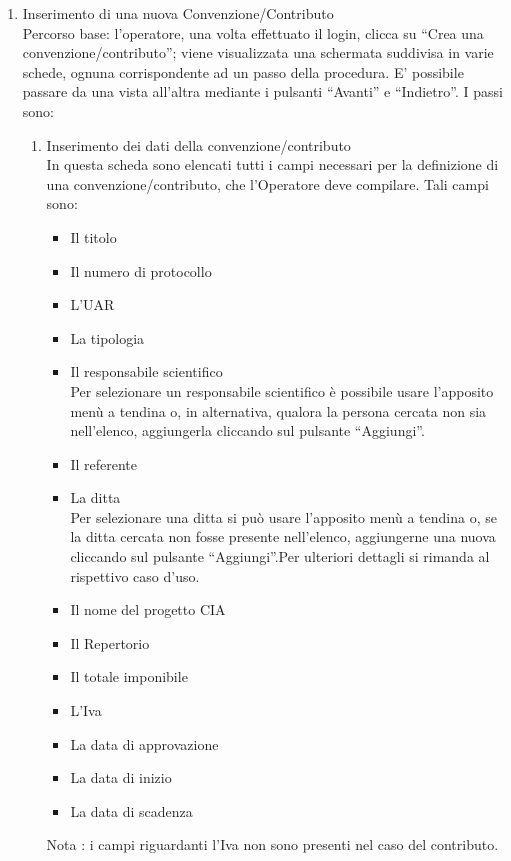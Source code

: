 \begin{enumerate}
  \item Inserimento di una nuova Convenzione/Contributo\\
  
  Percorso base:
  l'operatore, una volta effettuato il login, clicca su ``Crea una convenzione/contributo''; viene visualizzata una schermata suddivisa in varie schede,
  ognuna corrispondente ad un passo della procedura. E' possibile passare da una vista all'altra mediante i pulsanti ``Avanti'' e ``Indietro''. I passi sono:
  \begin{enumerate}
    \item Inserimento dei dati della convenzione/contributo\\
      
      In questa scheda sono elencati tutti i campi necessari per la definizione di una convenzione/contributo, 
      che l'Operatore deve compilare. Tali campi sono:
      \begin{itemize}
	\item Il titolo
	\item Il numero di protocollo
	\item L'UAR
	\item La tipologia
	\item Il responsabile scientifico\\
	  Per selezionare un responsabile scientifico è possibile usare l'apposito menù a tendina o, in alternativa, qualora la persona cercata non sia nell'elenco, aggiungerla cliccando sul pulsante ``Aggiungi''.
	\item Il referente
	\item La ditta\\
	  Per selezionare una ditta si può usare l'apposito menù a tendina o, se la ditta cercata non fosse presente nell'elenco, aggiungerne una nuova cliccando sul pulsante ``Aggiungi''.Per ulteriori dettagli si rimanda al
	  rispettivo caso d'uso.
	\item Il nome del progetto CIA
	\item Il Repertorio
	\item Il totale imponibile
	\item L'Iva
	\item La data di approvazione
	\item La data di inizio
	\item La data di scadenza
      \end{itemize}
      
      Nota : i campi riguardanti l'Iva non sono presenti nel caso del contributo.
      

\end{enumerate}
\end{enumerate}
